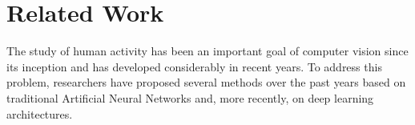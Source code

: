 \section{Related Work} \label{sec:soa}
The study of human activity has been an important goal of computer vision since its inception and has developed considerably in recent years. To address this problem, researchers have proposed several methods over the past years based on traditional Artificial Neural Networks and, more recently, on deep learning architectures. 




